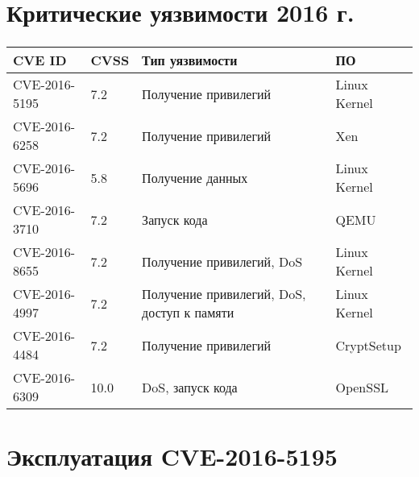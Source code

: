 
\section{Критические уязвимости 2016 г.}

\begin{frame}
\frametitle{\insertsection}

\begin{table}
    \begin{tabular}{|l|l|p{4cm}|l|}
        \hline \textbf{CVE ID} & \textbf{CVSS} & \textbf{Тип уязвимости} & \textbf{ПО} \\
        \hline CVE-2016-5195 & 7.2 & Получение привилегий & Linux Kernel \\
        \hline CVE-2016-6258 & 7.2 & Получение привилегий & Xen \\
        \hline CVE-2016-5696 & 5.8 & Получение данных & Linux Kernel \\
        \hline CVE-2016-3710 & 7.2 & Запуск кода & QEMU \\
        \hline CVE-2016-8655 & 7.2 & Получение привилегий, DoS & Linux Kernel \\
        \hline CVE-2016-4997 & 7.2 & Получение привилегий, DoS, доступ к памяти & Linux Kernel \\
        \hline CVE-2016-4484 & 7.2 & Получение привилегий & CryptSetup \\
        \hline CVE-2016-6309 & 10.0 & DoS, запуск кода & OpenSSL\\
        \hline
    \end{tabular}
\end{table}
\end{frame}


\section{Эксплуатация CVE-2016-5195}

